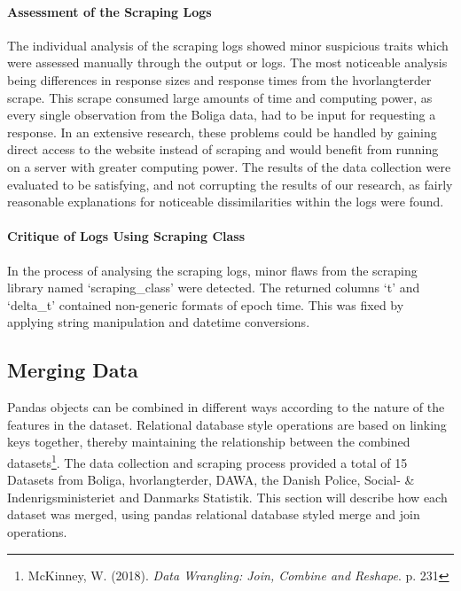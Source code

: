 \documentclass[12pt,a4paper]{article}
\begin{document}
\paragraph{Assessment of the Scraping Logs\newline}
The individual analysis of the scraping logs showed minor suspicious traits which were assessed manually through the output or logs. The most noticeable analysis being differences in response sizes and response times from the hvorlangterder scrape. This scrape consumed large amounts of time and computing power, as every single observation from the Boliga data, had to be input for requesting a response. In an extensive research, these problems could be handled by gaining direct access to the website instead of scraping and would benefit from running on a server with greater computing power. The results of the data collection were evaluated to be satisfying, and not corrupting the results of our research, as fairly reasonable explanations for noticeable dissimilarities within the logs were found. 

\paragraph{Critique of Logs Using Scraping Class\newline}
In the process of analysing the scraping logs, minor flaws from the scraping library named ‘scraping\_class’ were detected. The returned columns ‘t’ and ‘delta\_t’ contained non-generic formats of epoch time. This was fixed by applying string manipulation and datetime conversions. 

\subsection{Merging Data}
Pandas objects can be combined in different ways according to the nature of the features in the dataset. Relational database style operations are based on linking keys together, thereby maintaining the relationship between the combined datasets\footnote{McKinney, W. (2018). \textit{Data Wrangling: Join, Combine and Reshape}. p. 231 }.\newline
The data collection and scraping process provided a total of 15 Datasets from Boliga, hvorlangterder, DAWA, the Danish Police, Social- \& Indenrigsministeriet and Danmarks Statistik. This section will describe how each dataset was merged, using pandas relational database styled merge and join operations. 
\end{document}
